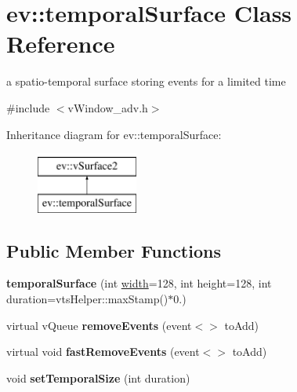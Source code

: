\hypertarget{classev_1_1temporalSurface}{}\section{ev\+:\+:temporal\+Surface Class Reference}
\label{classev_1_1temporalSurface}


a spatio-\/temporal surface storing events for a limited time  




{\ttfamily \#include $<$v\+Window\+\_\+adv.\+h$>$}

Inheritance diagram for ev\+:\+:temporal\+Surface\+:\begin{figure}[H]
\begin{center}
\leavevmode
\includegraphics[height=2.000000cm]{classev_1_1temporalSurface}
\end{center}
\end{figure}
\subsection*{Public Member Functions}
\begin{DoxyCompactItemize}
\item 
{\bfseries temporal\+Surface} (int \hyperlink{classev_1_1vSurface2_a1aa8027816352a15d5b9bf1f26f48e76}{width}=128, int height=128, int duration=vts\+Helper\+::max\+Stamp()$\ast$0.)\hypertarget{classev_1_1temporalSurface_ad2f8ebcbe5ff5825d0473cd05f00389e}{}\label{classev_1_1temporalSurface_ad2f8ebcbe5ff5825d0473cd05f00389e}

\item 
virtual v\+Queue {\bfseries remove\+Events} (event$<$$>$ to\+Add)\hypertarget{classev_1_1temporalSurface_a358c548e6727aa89d908e61ad948b1ca}{}\label{classev_1_1temporalSurface_a358c548e6727aa89d908e61ad948b1ca}

\item 
virtual void {\bfseries fast\+Remove\+Events} (event$<$$>$ to\+Add)\hypertarget{classev_1_1temporalSurface_a78a9bb93145915a90a5105bab812bb65}{}\label{classev_1_1temporalSurface_a78a9bb93145915a90a5105bab812bb65}

\item 
void {\bfseries set\+Temporal\+Size} (int duration)\hypertarget{classev_1_1temporalSurface_a35d4b67c18393961fa833d330a040e80}{}\label{classev_1_1temporalSurface_a35d4b67c18393961fa833d330a040e80}

\end{DoxyCompactItemize}
